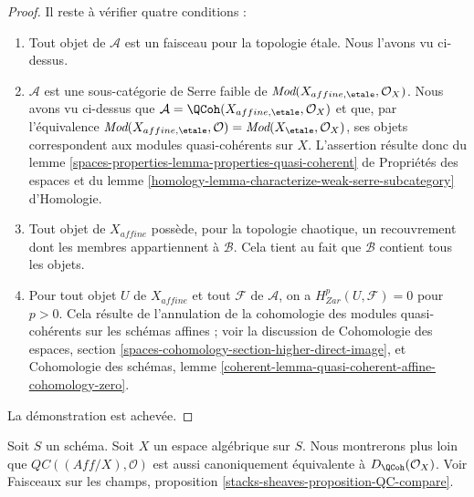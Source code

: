 \begin{proof}
\medskip\noindent
Il reste \`a v\'erifier quatre conditions :
\begin{enumerate}
\item Tout objet de $\mathcal{A}$ est un faisceau pour la topologie \'etale.
Nous l'avons vu ci-dessus.
\item $\mathcal{A}$ est une sous-cat\'egorie de Serre faible de
$\textit{Mod}(X_{affine,\etale},\mathcal{O}_X)$. Nous avons vu ci-dessus que
$\mathcal{A}=\QCoh(X_{affine,\etale},\mathcal{O}_X)$ et que, par
l'\'equivalence
$\textit{Mod}(X_{affine,\etale},\mathcal{O})=
\textit{Mod}(X_\etale,\mathcal{O}_X)$, ses objets correspondent aux modules
quasi-coh\'erents sur $X$. L'assertion r\'esulte donc du lemme
\ref{spaces-properties-lemma-properties-quasi-coherent} de Propri\'et\'es des
espaces et du lemme \ref{homology-lemma-characterize-weak-serre-subcategory}
d'Homologie.
\item Tout objet de $X_{affine}$ poss\`ede, pour la topologie chaotique, un
recouvrement dont les membres appartiennent \`a $\mathcal{B}$. Cela tient au
fait que $\mathcal{B}$ contient tous les objets.
\item Pour tout objet $U$ de $X_{affine}$ et tout $\mathcal{F}$ de
$\mathcal{A}$, on a $H^p_{Zar}(U,\mathcal{F})=0$ pour $p>0$. Cela r\'esulte de
l'annulation de la cohomologie des modules quasi-coh\'erents sur les sch\'emas
affines ; voir la discussion de Cohomologie des espaces, section
\ref{spaces-cohomology-section-higher-direct-image}, et Cohomologie des
sch\'emas, lemme
\ref{coherent-lemma-quasi-coherent-affine-cohomology-zero}.
\end{enumerate}
La d\'emonstration est achev\'ee.
\end{proof}

\begin{remark}
\label{remark-QC-compare}
Soit $S$ un sch\'ema. Soit $X$ un espace alg\'ebrique sur $S$.
Nous montrerons plus loin que
$\mathit{QC}((\textit{Aff}/X),\mathcal{O})$ est aussi canoniquement
\'equivalente \`a $D_\QCoh(\mathcal{O}_X)$. Voir Faisceaux sur les champs,
proposition \ref{stacks-sheaves-proposition-QC-compare}.
\end{remark}












